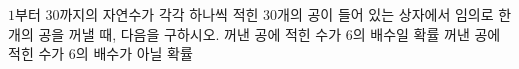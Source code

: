 $1$부터 $30$까지의 자연수가 각각 하나씩 적힌 $30$개의 공이 들어 있는 상자에서 임의로 한 개의 공을 꺼낼 때, 다음을 구하시오.
 꺼낸 공에 적힌 수가 $6$의 배수일 확률
 꺼낸 공에 적힌 수가 $6$의 배수가 아닐 확률
